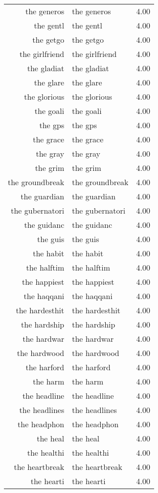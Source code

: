 \begin{table}[ht]
\begin{tabular}{rlr}
  the generos & the generos & 4.00 \\ 
  the gentl & the gentl & 4.00 \\ 
  the getgo & the getgo & 4.00 \\ 
  the girlfriend & the girlfriend & 4.00 \\ 
  the gladiat & the gladiat & 4.00 \\ 
  the glare & the glare & 4.00 \\ 
  the glorious & the glorious & 4.00 \\ 
  the goali & the goali & 4.00 \\ 
  the gps & the gps & 4.00 \\ 
  the grace & the grace & 4.00 \\ 
  the gray & the gray & 4.00 \\ 
  the grim & the grim & 4.00 \\ 
  the groundbreak & the groundbreak & 4.00 \\ 
  the guardian & the guardian & 4.00 \\ 
  the gubernatori & the gubernatori & 4.00 \\ 
  the guidanc & the guidanc & 4.00 \\ 
  the guis & the guis & 4.00 \\ 
  the habit & the habit & 4.00 \\ 
  the halftim & the halftim & 4.00 \\ 
  the happiest & the happiest & 4.00 \\ 
  the haqqani & the haqqani & 4.00 \\ 
  the hardesthit & the hardesthit & 4.00 \\ 
  the hardship & the hardship & 4.00 \\ 
  the hardwar & the hardwar & 4.00 \\ 
  the hardwood & the hardwood & 4.00 \\ 
  the harford & the harford & 4.00 \\ 
  the harm & the harm & 4.00 \\ 
  the headline & the headline & 4.00 \\ 
  the headlines & the headlines & 4.00 \\ 
  the headphon & the headphon & 4.00 \\ 
  the heal & the heal & 4.00 \\ 
  the healthi & the healthi & 4.00 \\ 
  the heartbreak & the heartbreak & 4.00 \\ 
  the hearti & the hearti & 4.00 \\ 

\end{tabular}
\end{table}
